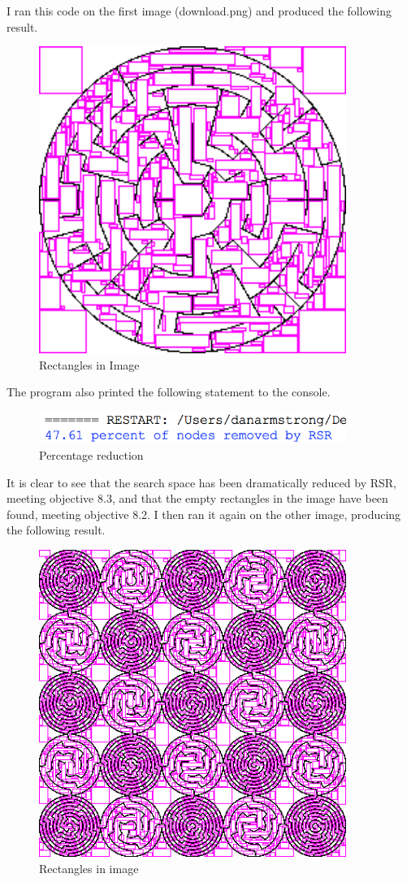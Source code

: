 \documentclass[titlepage]{article}
\begin{document}
I ran this code on the first image (download.png) and produced the following result. 

\begin{figure}[H]
  \centering
  \includegraphics[width=10cm]{RECTSbasicnonrect.png}
  \caption{Rectangles in Image}
  \label{fig:dijk}
\end{figure}

The program also printed the following statement to the console. 

\begin{figure}[H]
  \centering
  \includegraphics[width=10cm]{console1.png}
  \caption{Percentage reduction}
  \label{fig:dijk}
\end{figure}

It is clear to see that the search space has been dramatically reduced by RSR, meeting objective 8.3, and that the empty rectangles in the image have been found, meeting objective 8.2. I then ran it again on the other image, producing the following result. 

\begin{figure}[H]
  \centering
  \includegraphics[width=10cm]{RSReduction.png}
  \caption{Rectangles in image}
  \label{fig:dijk}
\end{figure}
\end{document}
